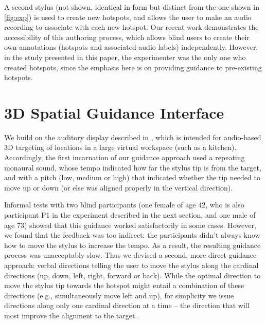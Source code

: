 \documentclass[runningheads]{res/templates/llncs}
\begin{document}
A second stylus (not shown, identical in form but distinct from the one
shown in \ref{fig:exp}) is used to create new hotspots, and allows the
user to make an audio recording to associate with each new hotspot. Our
recent work \cite{coughlanTowardsAccessibleAudioLabeling2020}
demonstrates the accessibility of this authoring process, which allows
blind users to create their own annotations (hotspots and associated
audio labels) independently. However, in the study presented in this
paper, the experimenter was the only one who created hotspots, since the
emphasis here is on providing guidance to pre-existing hotspots.

\hypertarget{material}{%
\section{3D Spatial Guidance Interface}\label{material}}

We build on the auditory display described in
\cite{mayAuditoryDisplaysFacilitate2019}, which is intended for
audio-based 3D targeting of locations in a large virtual workspace (such
as a kitchen). Accordingly, the first incarnation of our guidance
approach used a repeating monaural sound, whose tempo indicated how far
the stylus tip is from the target, and with a pitch (low, medium or
high) that indicated whether the tip needed to move up or down (or else
was aligned properly in the vertical direction).

Informal tests with two blind participants (one female of age 42, who is
also participant P1 in the experiment described in the next section, and
one male of age 73) showed that this guidance worked satisfactorily in
some cases. However, we found that the feedback was too indirect: the
participants didn't always know how to move the stylus to increase the
tempo. As a result, the resulting guidance process was unacceptably
slow. Thus we devised a second, more direct guidance approach: verbal
directions telling the user to move the stylus along the cardinal
directions (up, down, left, right, forward or back). While the optimal
direction to move the stylus tip towards the hotspot might entail a
combination of these directions (e.g., simultaneously move left and up),
for simplicity we issue directions along only one cardinal direction at
a time -- the direction that will most improve the alignment to the
target.
\end{document}
